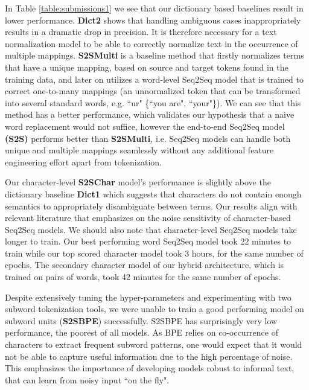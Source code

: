 \documentclass[letterpaper]{article} \usepackage{aaai19}  \usepackage{times}  \usepackage{helvet} \usepackage{courier}  \usepackage[hyphens]{url}  \usepackage{graphicx} \urlstyle{rm} \def\UrlFont{\rm}  \usepackage{graphicx}  \frenchspacing  \setlength{\pdfpagewidth}{8.5in}  \setlength{\pdfpageheight}{11in}
\newcommand{\citep}{\cite}
\begin{document}
In Table \ref{table:submissions1} we see that our dictionary based baselines result in lower performance. \textbf{Dict2} shows that handling ambiguous cases inappropriately results in a dramatic drop in precision. It is therefore necessary for a text normalization model to be able to correctly normalize text in the occurrence of multiple mappings.  \textbf{S2SMulti} is a baseline method that firstly normalizes terms that have a unique mapping, based on source and target tokens found in the training data, and later on utilizes a word-level Seq2Seq model that is trained to correct one-to-many mappings (an unnormalized token that can be transformed into several standard words, e.g. ``ur"  \{``you are", ``your"\}). We can see that this method has a better performance, which validates our hypothesis that a naive word replacement would not suffice, however the end-to-end  Seq2Seq model \textbf{(S2S)} performs better than \textbf{S2SMulti}, i.e. Seq2Seq models can handle both unique and multiple mappings seamlessly without any additional feature engineering effort apart from tokenization. 

Our character-level \textbf{S2SChar} model's performance is slightly above the dictionary baseline \textbf{Dict1} which suggests that characters do not contain enough semantics to appropriately disambiguate between terms. Our results align with relevant literature \citep{belinkov2017synthetic} that emphasizes on the noise sensitivity of character-based Seq2Seq models. We should also note that character-level Seq2Seq models take longer to train. Our best performing word Seq2Seq model took 22 minutes to train while our top scored character model took 3 hours, for the same number of epochs. The secondary character model of our hybrid architecture, which is trained on pairs of words, took 42 minutes for the same number of epochs.  

Despite extensively tuning the hyper-parameters and experimenting with two subword tokenization tools, we were unable to train a good performing model on subword units (\textbf{S2SBPE}) successfully. S2SBPE has surprisingly very low performance, the poorest of all models. As BPE relies on co-occurrence of characters to extract frequent subword patterns, one would expect that it would not be able to capture useful information due to the high percentage of noise. This emphasizes the importance of developing models robust to informal text, that can learn from noisy input ``on the fly".
\end{document}
